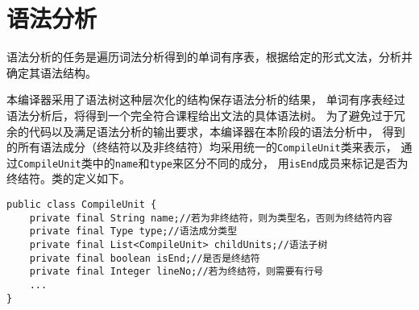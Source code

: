 \chapter{语法分析}
语法分析的任务是遍历词法分析得到的单词有序表，根据给定的形式文法，分析并确定其语法结构。

本编译器采用了语法树这种层次化的结构保存语法分析的结果，
单词有序表经过语法分析后，将得到一个完全符合课程给出文法的具体语法树。
为了避免过于冗余的代码以及满足语法分析的输出要求，本编译器在本阶段的语法分析中，
得到的所有语法成分（终结符以及非终结符）均采用统一的\texttt{CompileUnit}类来表示，
通过\texttt{CompileUnit}类中的\texttt{name}和\texttt{type}来区分不同的成分，
用\texttt{isEnd}成员来标记是否为终结符。类的定义如下。
\begin{verbatim}
public class CompileUnit {
    private final String name;//若为非终结符，则为类型名，否则为终结符内容
    private final Type type;//语法成分类型
    private final List<CompileUnit> childUnits;//语法子树
    private final boolean isEnd;//是否是终结符
    private final Integer lineNo;//若为终结符，则需要有行号
    ...
}
\end{verbatim}   